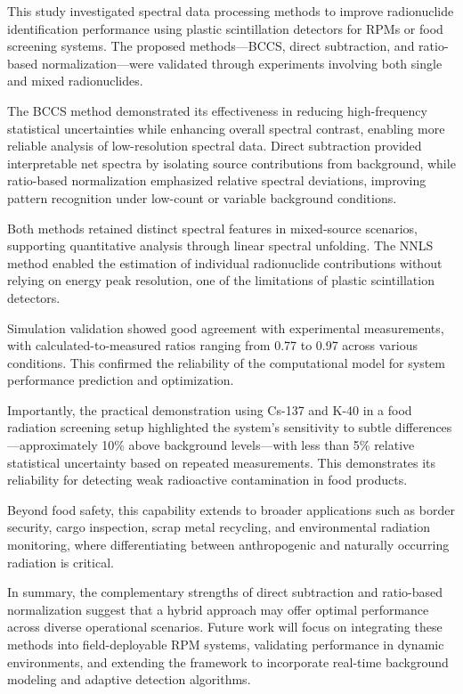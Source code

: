 \documentclass[10pt]{wlscirep}
\begin{document}
This study investigated spectral data processing methods to improve radionuclide identification performance using plastic scintillation detectors for RPMs or food screening systems. The proposed methods—BCCS, direct subtraction, and ratio-based normalization—were validated through experiments involving both single and mixed radionuclides.

The BCCS method demonstrated its effectiveness in reducing high-frequency statistical uncertainties while enhancing overall spectral contrast, enabling more reliable analysis of low-resolution spectral data. Direct subtraction provided interpretable net spectra by isolating source contributions from background, while ratio-based normalization emphasized relative spectral deviations, improving pattern recognition under low-count or variable background conditions.

Both methods retained distinct spectral features in mixed-source scenarios, supporting quantitative analysis through linear spectral unfolding. The NNLS method enabled the estimation of individual radionuclide contributions without relying on energy peak resolution, one of the limitations of plastic scintillation detectors.

Simulation validation showed good agreement with experimental measurements, with calculated-to-measured ratios ranging from 0.77 to 0.97 across various conditions. This confirmed the reliability of the computational model for system performance prediction and optimization.

Importantly, the practical demonstration using Cs-137 and K-40 in a food radiation screening setup highlighted the system's sensitivity to subtle differences—approximately 10\% above background levels—with less than 5\% relative statistical uncertainty based on repeated measurements. This demonstrates its reliability for detecting weak radioactive contamination in food products.

Beyond food safety, this capability extends to broader applications such as border security, cargo inspection, scrap metal recycling, and environmental radiation monitoring, where differentiating between anthropogenic and naturally occurring radiation is critical.

In summary, the complementary strengths of direct subtraction and ratio-based normalization suggest that a hybrid approach may offer optimal performance across diverse operational scenarios. Future work will focus on integrating these methods into field-deployable RPM systems, validating performance in dynamic environments, and extending the framework to incorporate real-time background modeling and adaptive detection algorithms.
\end{document}
